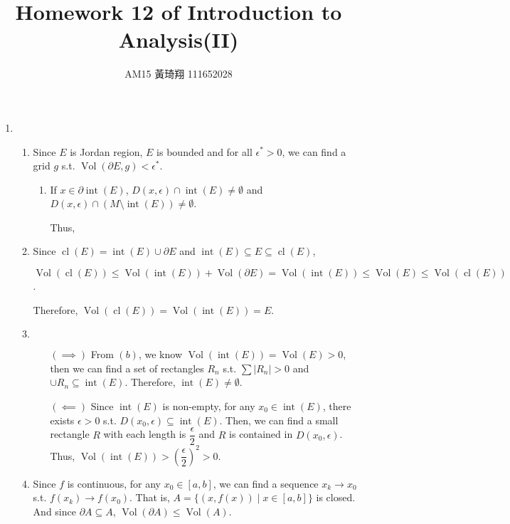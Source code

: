 \documentclass[12pt]{article}
\title{Homework 12 of Introduction to Analysis(II)}
\author{AM15 黃琦翔 111652028}
\DeclareMathOperator{\volume}{Vol}
\DeclareMathOperator{\interior}{int}
\DeclareMathOperator{\closure}{cl}
\newcommand{\boundary}{\partial}
\begin{document}
\maketitle
\begin{enumerate}
    \item \begin{enumerate}
        \item Since $E$ is Jordan region, $E$ is bounded and for all $\epsilon^* > 0$, we can find a grid $g$ s.t. $\volume(\partial E, g) < \epsilon^*$.
        \begin{enumerate}
            \item If $x\in \boundary\interior(E)$, $D(x, \epsilon) \cap \interior(E) \neq \emptyset$ and $D(x, \epsilon) \cap (M\setminus \interior(E)) \neq \emptyset$.
            
            Thus, 
        \end{enumerate}

        \item Since $\closure(E) = \interior(E) \cup \boundary E$ and $\interior(E)\subseteq E \subseteq \closure(E)$,

        $\volume(\closure(E)) \leq \volume(\interior(E)) + \volume(\boundary E) = \volume(\interior(E))\leq \volume(E) \leq \volume(\closure(E))$.

        Therefore, $\volume(\closure(E)) = \volume(\interior(E)) = E$.

        \item $\ $
        \begin{enumerate}
            \item[$(\implies)$] From $(b)$, we know $\volume(\interior(E)) = \volume(E) > 0$, 
            then we can find a set of rectangles $R_n$ s.t. $\sum |R_n| > 0$ and $\cup R_n \subseteq \interior(E)$.
            Therefore, $\interior(E) \neq \emptyset$.

            \item[$(\impliedby)$] Since $\interior(E)$ is non-empty, for any $x_0\in \interior(E)$, there exists $\epsilon > 0$ s.t. $D(x_0, \epsilon) \subseteq \interior(E)$.
            Then, we can find a small rectangle $R$ with each length is $\dfrac{\epsilon}{2}$ and $R$ is contained in $D(x_0, \epsilon)$.
            Thus, $\volume(\interior(E)) > \left(\dfrac{\epsilon}{2}\right)^2 > 0$.
        \end{enumerate}

        \item Since $f$ is continuous, for any $x_0 \in [a, b]$, we can find a sequence $x_k \to x_0$ s.t. $f(x_k) \to f(x_0)$.
        That is, $A = \{(x, f(x)) \mid x\in [a, b]\}$ is closed.
        And since $\boundary A \subseteq A$, $\volume(\boundary A) \leq \volume(A)$.
        

\end{enumerate}
\end{enumerate}
\end{document}
